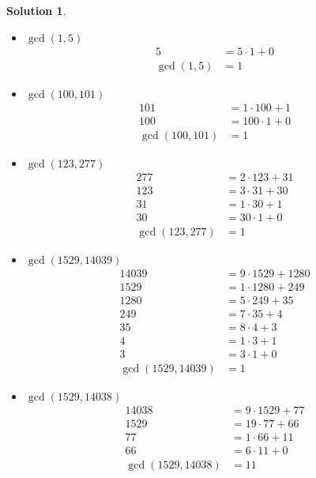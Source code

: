 \documentclass[UTF8]{report}
\newtheorem{solution}{Solution}
\theoremstyle{MyLineTheoremStyle} %
\theoremstyle{MyBlockTheoremStyle} %
\theoremstyle{MySubsubsectionStyle} %
\begin{document}
\begin{solution}
    \begin{itemize}
        \item[a)] \(\gcd(1, 5)\)
        \[
        \begin{aligned}
            5 &= 5 \cdot 1 + 0 \\
            \gcd(1, 5) &= 1
        \end{aligned}
        \]

        \item[b)] \(\gcd(100, 101)\)
        \[
        \begin{aligned}
            101 &= 1 \cdot 100 + 1 \\
            100 &= 100 \cdot 1 + 0 \\
            \gcd(100, 101) &= 1
        \end{aligned}
        \]

        \item[c)] \(\gcd(123, 277)\)
        \[
        \begin{aligned}
            277 &= 2 \cdot 123 + 31 \\
            123 &= 3 \cdot 31 + 30 \\
            31 &= 1 \cdot 30 + 1 \\
            30 &= 30 \cdot 1 + 0 \\
            \gcd(123, 277) &= 1
        \end{aligned}
        \]

        \item[d)] \(\gcd(1529, 14039)\)
        \[
        \begin{aligned}
            14039 &= 9 \cdot 1529 + 1280 \\
            1529 &= 1 \cdot 1280 + 249 \\
            1280 &= 5 \cdot 249 + 35 \\
            249 &= 7 \cdot 35 + 4 \\
            35 &= 8 \cdot 4 + 3 \\
            4 &= 1 \cdot 3 + 1 \\
            3 &= 3 \cdot 1 + 0 \\
            \gcd(1529, 14039) &= 1
        \end{aligned}
        \]

        \item[e)] \(\gcd(1529, 14038)\)
        \[
        \begin{aligned}
            14038 &= 9 \cdot 1529 + 77 \\
            1529 &= 19 \cdot 77 + 66 \\
            77 &= 1 \cdot 66 + 11 \\
            66 &= 6 \cdot 11 + 0 \\
            \gcd(1529, 14038) &= 11
        \end{aligned}
        \]


\end{itemize}
\end{solution}
\end{document}
